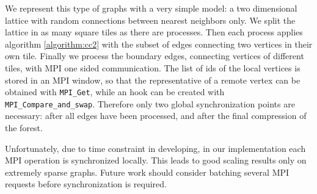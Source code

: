 We represent this type of graphs with a very simple model: a two dimensional lattice with random connections between nearest neighbors
only. We split the lattice in as many square tiles as there are processes. Then each process applies algorithm \ref{algorithm:cc2} with the subset
of edges connecting two vertices in their own tile. Finally we process the boundary edges, connecting vertices of different tiles, with MPI
one sided communication. The list of ids of the local vertices is stored in an MPI window, so that the representative of a remote vertex
can be obtained with \verb|MPI_Get|, while an hook can be created with \verb|MPI_Compare_and_swap|.
Therefore only two global synchronization points are necessary: after all edges have been processed, and after the final compression
of the forest.

Unfortunately, due to time constraint in developing, in our implementation each MPI operation is synchronized locally.
This leads to good scaling results only on extremely sparse graphs. %
Future work should consider batching several MPI requests before synchronization is required.
